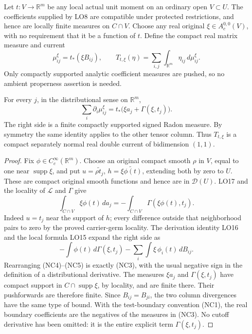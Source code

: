 Let \(t:V\to\mathbb R^m\) be any local actual unit moment on an
ordinary open \(V\subset U\).  The coefficients supplied by LO8
are compatible under protected restrictions, and hence are locally
finite measures on \(C\cap V\).  Choose any real original
\(\xi\in A_c^{0,0}(V)\), with no requirement that it be a function
of \(t\).  Define the compact real matrix measure and current
\[
 \mu_{ij}^\xi=t_*(\xi B_{ij}),\qquad
 T_{t,\xi}(\eta)=\sum_{i,j}\int_{\mathbb R^m}\eta_{ij}\,d\mu_{ij}^\xi.
 \tag{NC2}
\]
Only compactly supported analytic coefficient measures are pushed, so
no ambient properness assertion is needed.

\begin{proposition}
For every \(j\), in the distributional sense on \(\mathbb R^m\),
\[
       \sum_i\partial_i\mu_{ij}^\xi
            =t_*\bigl(\xi a_j+\Gamma(\xi,t_j)\bigr).
 \tag{NC3}
\]
The right side is a finite compactly supported signed Radon measure.
By symmetry the same identity applies to the other tensor column.
Thus \(T_{t,\xi}\) is a compact separately normal real double current
of bidimension \((1,1)\).
\end{proposition}

\begin{proof}
Fix \(\phi\in C_c^\infty(\mathbb R^m)\).  Choose an original
compact smooth \(\rho\) in \(V\), equal to one near
\(\operatorname{supp}\xi\), and put
\(u=\widetilde{\rho t_j}\),
\(h=\widetilde{\xi\phi(t)}\), extending both by zero to \(U\).
These are compact original smooth functions and hence are in
\(\mathcal D(U)\).  LO17 and the locality of \(\mathscr L\)
and \(\Gamma\) give
\[
             \int_{C\cap V}\xi\phi(t)\,da_j
                      =-\int_{C\cap V}\Gamma(\xi\phi(t),t_j).
 \tag{NC4}
\]
Indeed \(u=t_j\) near the support of \(h\); every difference
outside that neighborhood pairs to zero by the proved carrier-germ
locality.  The derivation identity LO16 and the local formula LO15
expand the right side as
\[
 -\int\phi(t)\,d\Gamma(\xi,t_j)
                   -\sum_i\int\xi\,\phi_i(t)\,dB_{ij}.
 \tag{NC5}
\]
Rearranging (NC4)--(NC5) is exactly (NC3), with the usual negative
sign in the definition of a distributional derivative.
The measures \(\xi a_j\) and \(\Gamma(\xi,t_j)\) have compact
support in \(C\cap\operatorname{supp}\xi\), by locality, and
are finite there.  Their pushforwards are therefore finite.  Since
\(B_{ij}=B_{ji}\), the two column divergences have the same type
of bound.  With the test-boundary convention (NC1), the real
boundary coefficients are the negatives of the measures in (NC3).
No cutoff derivative has been omitted: it is the entire explicit
term \(\Gamma(\xi,t_j)\).
\end{proof}

